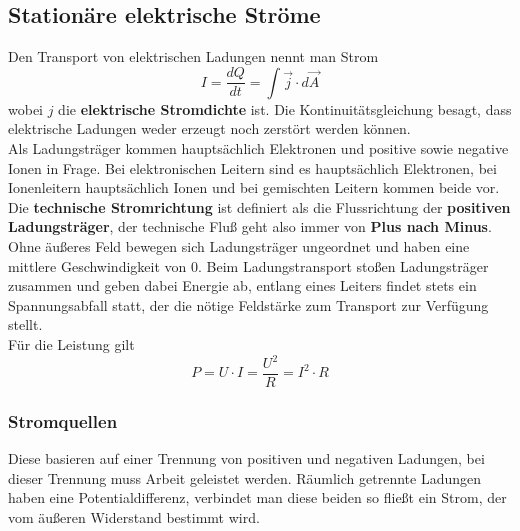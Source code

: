 \documentclass[12pt,a4paper,ngerman]{article}
\begin{document}
\subsection{Stationäre elektrische Ströme}
Den Transport von elektrischen Ladungen nennt man Strom
\begin{equation}
I = \frac{dQ}{dt} = \int{\vec{j} \cdot d\vec{A}}
\end{equation}
wobei $j$ die \textbf{elektrische Stromdichte} ist. Die Kontinuitätsgleichung besagt, dass elektrische Ladungen weder erzeugt noch zerstört werden können. \\
Als Ladungsträger kommen hauptsächlich Elektronen und positive sowie negative Ionen in Frage. Bei elektronischen Leitern sind es hauptsächlich Elektronen, bei Ionenleitern hauptsächlich Ionen und bei gemischten Leitern kommen beide vor. Die \textbf{technische Stromrichtung} ist definiert als die Flussrichtung der \textbf{positiven Ladungsträger}, der technische Fluß geht also immer von \textbf{Plus nach Minus}.
Ohne äußeres Feld bewegen sich Ladungsträger ungeordnet und haben eine mittlere Geschwindigkeit von 0. Beim Ladungstransport stoßen Ladungsträger zusammen und geben dabei Energie ab, entlang eines Leiters findet stets ein Spannungsabfall statt, der die nötige Feldstärke zum Transport zur Verfügung stellt. \\
Für die Leistung gilt
\begin{equation}
P = U \cdot I = \frac{U^2}{R} = I^2 \cdot R
\end{equation}

\subsubsection*{Stromquellen}
Diese basieren auf einer Trennung von positiven und negativen Ladungen, bei dieser Trennung muss Arbeit geleistet werden. Räumlich getrennte Ladungen haben eine Potentialdifferenz, verbindet man diese beiden so fließt ein Strom, der vom äußeren Widerstand bestimmt wird.
\end{document}
